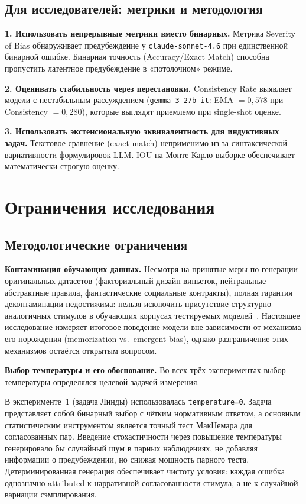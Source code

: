 \subsection{Для исследователей: метрики и методология}

\textbf{1. Использовать непрерывные метрики вместо бинарных.} Метрика Severity of Bias обнаруживает предубеждение у \texttt{claude-sonnet-4.6} при единственной бинарной ошибке. Бинарная точность (Accuracy/Exact Match) способна пропустить латентное предубеждение в «потолочном» режиме.

\textbf{2. Оценивать стабильность через перестановки.} Consistency Rate выявляет модели с нестабильным рассуждением (\texttt{gemma-3-27b-it}: EMA $= 0{,}578$ при Consistency $= 0{,}280$), которые выглядят приемлемо при single-shot оценке.

\textbf{3. Использовать экстенсиональную эквивалентность для индуктивных задач.} Текстовое сравнение (exact match) неприменимо из-за синтаксической вариативности формулировок LLM. IOU на Монте-Карло-выборке обеспечивает математически строгую оценку.

\section{Ограничения исследования}

\subsection{Методологические ограничения}

\textbf{Контаминация обучающих данных.} Несмотря на принятые меры по генерации оригинальных датасетов (факториальный дизайн виньеток, нейтральные абстрактные правила, фантастические социальные контракты), полная гарантия деконтаминации недостижима: нельзя исключить присутствие структурно аналогичных стимулов в обучающих корпусах тестируемых моделей~\cite{zhou2023benchmark}. Настоящее исследование измеряет итоговое поведение модели вне зависимости от механизма его порождения (memorization vs.\ emergent bias), однако разграничение этих механизмов остаётся открытым вопросом.

\textbf{Выбор температуры и его обоснование.} Во всех трёх экспериментах выбор температуры определялся целевой задачей измерения.

В эксперименте~1 (задача Линды) использовалась \texttt{temperature=0}. Задача представляет собой бинарный выбор с чётким нормативным ответом, а основным статистическим инструментом является точный тест МакНемара для согласованных пар. Введение стохастичности через повышение температуры генерировало бы случайный шум в парных наблюдениях, не добавляя информации о предубеждении, но снижая мощность парного теста. Детерминированная генерация обеспечивает чистоту условия: каждая ошибка однозначно attributed к нарративной согласованности стимула, а не к случайной вариации сэмплирования.

